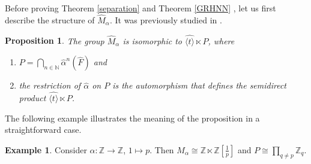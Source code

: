 \documentclass{amsart}
\newtheorem{pro}[lem]{Proposition}
\theoremstyle{definition}
\newtheorem{exa}[lem]{Example}
\theoremstyle{remark}
\newcommand{\Z}{\mathbb{Z}}
\newcommand{\N}{\mathbb{N}}
\begin{document}
 Before proving Theorem  \ref{separation} and Theorem \ref{GRHNN} ,
 let us first describe the structure of $\widehat M_\alpha$. It was  previously  studied in   \cite[Theorem 5.8]{GJPZ14}.
\begin{pro}\label{profiniteHNN}
 The group  $\widehat M_\alpha$  is isomorphic to   $\widehat {\langle t\rangle}\ltimes P$, where  
\begin{enumerate}
\item  $P=\displaystyle \bigcap_{n\in \N} \widehat \alpha^n(\widehat F)$ and  
\item the restriction of $\widehat \alpha$ on $P$ is the automorphism that defines the semidirect product  $\widehat {\langle t\rangle}\ltimes P$.
\end{enumerate}
\end{pro}
The following example illustrates the meaning of the proposition in a straightforward case.
\begin{exa}
Consider  $\alpha :\Z\to \Z$, $1\mapsto p$. Then $M_\alpha\cong\Z\ltimes  \Z[\frac 1p]$ and $P\cong \prod_{q\ne p}\Z_q$.
\end{exa}
\end{document}
